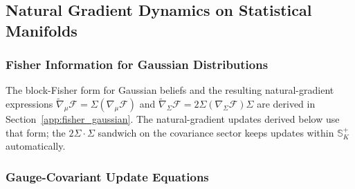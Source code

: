 \documentclass[11pt]{article}
\begin{document}
\subsection{Natural Gradient Dynamics on Statistical Manifolds}

\subsubsection{Fisher Information for Gaussian Distributions}

The block-Fisher form for Gaussian beliefs and the resulting natural-gradient expressions $\tilde{\nabla}_\mu \mathcal{F} = \Sigma (\nabla_\mu \mathcal{F})$ and $\tilde{\nabla}_\Sigma \mathcal{F} = 2\Sigma (\nabla_\Sigma \mathcal{F}) \Sigma$ are derived in Section~\ref{app:fisher_gaussian}. The natural-gradient updates derived below use that form; the $2\Sigma \cdot \Sigma$ sandwich on the covariance sector keeps updates within $\mathbb{S}^+_K$ automatically.

\subsubsection{Gauge-Covariant Update Equations}
\end{document}
